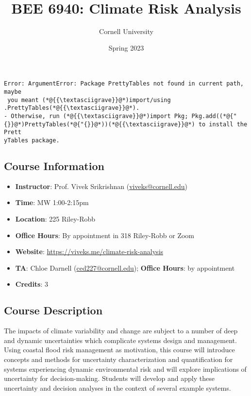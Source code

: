 \documentclass[12pt,a4paper]{article}
\title{ BEE 6940: Climate Risk Analysis }
\author{ Cornell University }
\date{ Spring 2023 }
\begin{document}
\maketitle

\begin{lstlisting}
Error: ArgumentError: Package PrettyTables not found in current path, maybe
 you meant (*@{{\textasciigrave}}@*)import/using .PrettyTables(*@{{\textasciigrave}}@*).
- Otherwise, run (*@{{\textasciigrave}}@*)import Pkg; Pkg.add((*@{"{}}@*)PrettyTables(*@{"{}}@*))(*@{{\textasciigrave}}@*) to install the Prett
yTables package.
\end{lstlisting}


\subsection{Course Information}
\begin{itemize}
\item \textbf{Instructor}: Prof. Vivek Srikrishnan (\href{mailto:viveks@cornell.edu}{viveks@cornell.edu})


\item \textbf{Time}: MW 1:00-2:15pm


\item \textbf{Location}: 225 Riley-Robb


\item \textbf{Office Hours}: By appointment in 318 Riley-Robb or Zoom


\item \textbf{Website}: \href{https://viveks.me/climate-risk-analysis}{https://viveks.me/climate-risk-analysis}


\item \textbf{TA}: Chloe Darnell (\href{mailto:ced227@cornell.edu}{ced227@cornell.edu}); \textbf{Office Hours}: by appointment


\item \textbf{Credits}: 3

\end{itemize}
\subsection{Course Description}
The impacts of climate variability and change are subject to a number of deep and dynamic uncertainties which complicate systems design and management. Using coastal flood risk management as motivation, this course will introduce concepts and methods for uncertainty characterization and quantification for systems experiencing dynamic environmental risk and will explore implications of uncertainty for decision-making. Students will develop and apply these uncertainty and decision analyses in the context of several example systems. 
\end{document}
